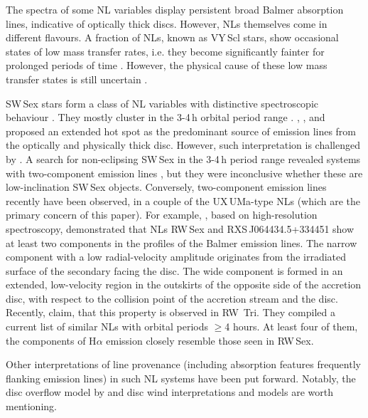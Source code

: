 \documentclass[fleqn,usenatbib]{mnras}
\begin{document}
The spectra of some NL variables display persistent broad Balmer 
absorption lines, indicative of optically thick discs. However, NLs themselves come in different flavours.  
A fraction of NLs, known as  VY\,Scl stars, show  occasional states of low mass transfer rates, i.e. they become significantly 
fainter for prolonged periods of time \citep[months to years,][]{1974Obs....94..116W,2020MNRAS.494..425R}.   
However, the physical cause of these low mass transfer states is still uncertain \citep{1994ApJ...427..956L,1998ApJ...499..348K,2018A&A...617A..16S}. 

SW\,Sex stars form a class of NL variables with distinctive spectroscopic behaviour \citep{1991AJ....102..272T}. 
They mostly cluster in the 3-4\,h orbital period range \citep{10.1111/j.1365-2966.2007.11743.x}. 
\citet{1996MNRAS.282...99B}, \citet{2013MNRAS.428.3559D}, and \citet{2014AJ....147...68T} proposed an extended hot 
spot as the predominant source of emission lines  from the optically and physically thick disc. However, such interpretation 
is challenged by \citet{2007MNRAS.377.1747R,2015MNRAS.452..146R}.
A search for non-eclipsing SW\,Sex in the 3-4\,h period range revealed systems with 
two-component emission lines \citep{10.1111/j.1365-2966.2006.11245.x}, but they were inconclusive whether these are low-inclination 
SW\,Sex objects. 
Conversely,  two-component emission lines recently have been observed,  in a couple of  the UX\,UMa-type NLs (which are 
the primary concern of this paper).
For example, \citet{2017MNRAS.470.1960H}, based on high-resolution spectroscopy,  demonstrated  that NLs RW\,Sex and 
RXS\,J064434.5+334451  show at least two components in the profiles of  the Balmer emission lines. 
The narrow component with a low radial-velocity amplitude originates 
from the irradiated surface of the secondary facing the disc. 
The wide component 
is formed in an extended, low-velocity region in the outskirts of the opposite side of the accretion disc, with respect
to the collision point of the accretion stream and the disc. Recently, \citet{Subebekova20} claim, that this property is 
observed in RW~Tri.  They  compiled  a current list of similar NLs  with orbital periods 
$\geq$4 hours. At least four of them, the components of H$\alpha$ emission   %
 closely resemble those seen in RW\,Sex. 


Other interpretations of line provenance (including absorption features frequently flanking emission lines) in such NL systems have 
been put forward. Notably, the disc overflow model  by \citet{1996ApJ...471..949H} and disc wind interpretations and models
\citep[e.g.][]{1996AJ....111.2422P,1996Natur.382..789M} are worth mentioning. 
 
\end{document}
